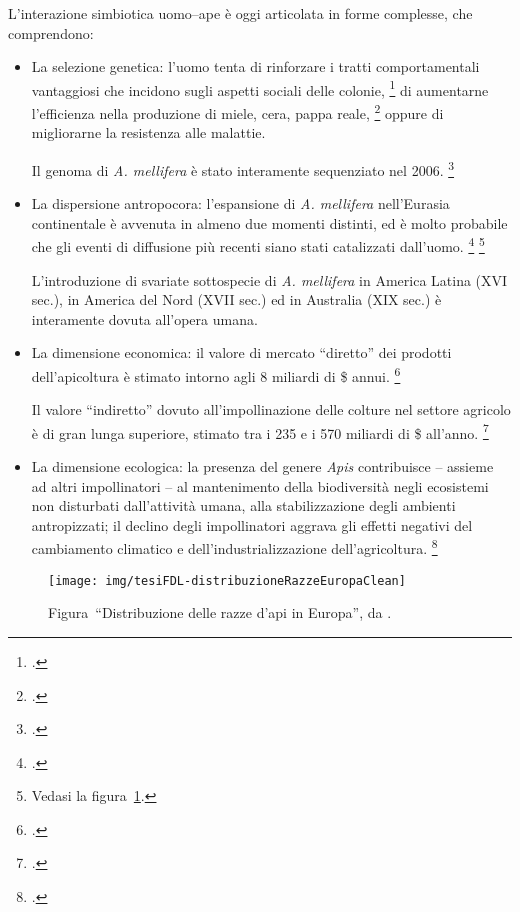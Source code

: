 L'interazione simbiotica uomo--ape è oggi articolata in forme complesse, che comprendono:
\begin{itemize}
    \item La selezione genetica: l'uomo tenta di rinforzare i tratti comportamentali vantaggiosi che incidono sugli aspetti sociali delle colonie, \footcite{behavGenetics}
    di aumentarne l'efficienza nella produzione di miele, cera, pappa reale, \footcite{algerianHoney}
    oppure di migliorarne la resistenza alle malattie.

    Il genoma di \emph{A. mellifera} è stato interamente sequenziato nel 2006. \footcite{genomeSeq}
    \item La dispersione antropocora: l'espansione di \emph{A. mellifera} nell'Eurasia continentale è avvenuta in almeno due momenti distinti, ed è molto probabile che gli eventi di diffusione più recenti siano stati catalizzati dall'uomo.
    \footcite{antropocora}
    \footnote{Vedasi la figura~\ref{img:europ}.}

        L'introduzione di svariate sottospecie di \emph{A. mellifera} in America Latina (XVI sec.), in America del Nord (XVII sec.) ed in Australia (XIX sec.) è interamente dovuta all'opera umana.
    \item La dimensione economica: il valore di mercato ``diretto'' dei prodotti dell'apicoltura è stimato intorno agli 8 miliardi di \$ annui. \footcite{honeymarket1}

        Il valore ``indiretto'' dovuto all'impollinazione delle colture nel settore agricolo è di gran lunga superiore, stimato tra i 235 e i 570 miliardi di \$ all'anno. \footcite{honeymarket2,honeymarket3}
    \item La dimensione ecologica: la presenza del genere \emph{Apis} contribuisce -- assieme ad altri impollinatori -- al mantenimento della biodiversità negli ecosistemi non disturbati dall'attività umana, alla stabilizzazione degli ambienti antropizzati; il declino degli impollinatori aggrava gli effetti negativi del cambiamento climatico e dell'industrializzazione dell'agricoltura. \footcite{decline}
\end{itemize}

\begin{figure}
    \centering
    \texttt{[image: img/tesiFDL-distribuzioneRazzeEuropaClean]}

    \caption[Distribuzione delle razze d'api in Europa]{Figura~``Distribuzione
    delle razze d'api in Europa'', da \cite[24]{tesiFDL}.}
    \label{img:europ}
\end{figure}

